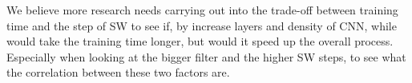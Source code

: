 \documentclass[a4paper,10pt]{article}
\begin{document}
We believe more research needs carrying out into the trade-off between training time and the step of SW to see if, by increase layers and density of CNN, while would take the training time longer, but would it speed up the overall process. Especially when looking at the bigger filter and the higher SW steps, to see what the correlation between these two factors are.


%	

	
	
	
	
	
\end{document}
